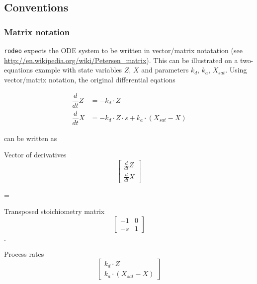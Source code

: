 \documentclass[a4paper]{article}
\newcommand{\rodeo}{\texttt{rodeo}}
\begin{document}
\subsection{Conventions} \label{sec:input:conventions}

\subsubsection{Matrix notation} \label{sec:input:conventions:matrix}
\rodeo{} expects the ODE system to be written in vector/matrix notatation (see \url{http://en.wikipedia.org/wiki/Petersen_matrix}). This can be illustrated on a two-equations example with state variables $Z$, $X$ and parameters $k_d$, $k_a$, $X_{sat}$. Using vector/matrix notation, the original differential eqations 

\begin{align}
  \dfrac{d}{dt} Z &= -k_d \cdot Z \nonumber \\
  \dfrac{d}{dt} X &= -k_d \cdot Z \cdot s + k_a \cdot (X_{sat} - X) \nonumber 
\end{align}

can be written as

\bigskip
\begin{minipage}[b]{0.25\textwidth}
  Vector of derivatives
  \begin{equation*}
  \begin{bmatrix} \frac{d}{dt}Z \\ \frac{d}{dt}X \end{bmatrix}
  \end{equation*}
\end{minipage}
\begin{minipage}[b]{0.1\textwidth}
 =
\end{minipage}
\begin{minipage}[b]{0.25\textwidth}
Transposed stoichiometry matrix
\begin{equation*}
\begin{bmatrix} -1 & 0 \\ -s & 1 \end{bmatrix}
\end{equation*}
\end{minipage}
\begin{minipage}[b]{0.1\textwidth}
 $\cdot$
\end{minipage}
\begin{minipage}[b]{0.25\textwidth}
Process rates
\begin{equation*}
\begin{bmatrix} k_d \cdot Z \\ k_a \cdot (X_{sat} - X) \end{bmatrix}
\end{equation*}
\end{minipage}
\end{document}

